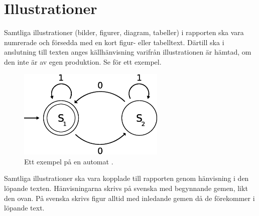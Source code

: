 \section{Illustrationer}
\label{sec:illustrations}
\noindent
Samtliga illustrationer (bilder, figurer, diagram, tabeller) i rapporten ska 
vara numrerade och försedda med en kort figur- eller tabelltext.
Därtill ska i anslutning till texten anges källhänvisning varifrån 
illustrationen är hämtad, om den inte är av egen produktion.
Se  för ett exempel.

\begin{figure}
	\centering
	\includegraphics[width=7cm]{automata.eps} %
	\caption[Ett exempel på en automat.]{Ett exempel på en automat 
	\citep{Wikipedia2012at}.}
	\label{fig:automata}
\end{figure}

Samtliga illustrationer ska vara kopplade till rapporten genom hänvisning i den 
löpande texten.
Hänvisningarna skrivs på svenska med begynnande gemen, likt den ovan.
På svenska skrivs figur alltid med inledande gemen då de förekommer i löpande 
text.


